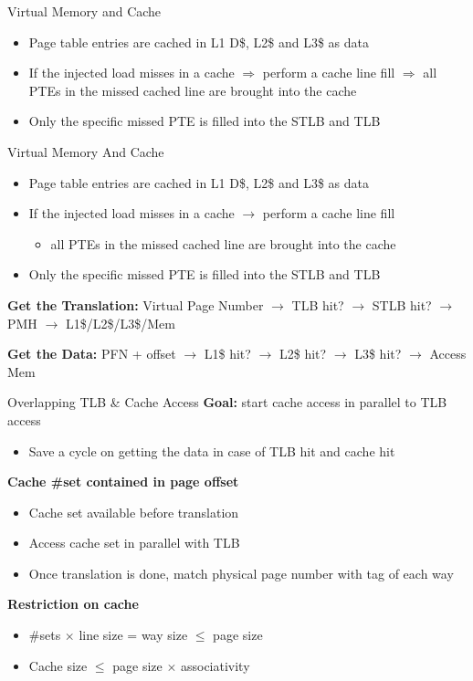 \documentclass[aspectratio=169,12pt]{beamer}
\begin{document}
\begin{frame}{Virtual Memory and Cache}
\begin{tikzpicture}
\end{tikzpicture}

\footnotesize
\begin{itemize}
\item Page table entries are cached in L1 D\$, L2\$ and L3\$ as data
\item If the injected load misses in a cache $\Rightarrow$ perform a cache line fill $\Rightarrow$ all PTEs in the missed cached line are brought into the cache
\item Only the specific missed PTE is filled into the STLB and TLB
\end{itemize}
\end{frame}


\begin{frame}{Virtual Memory And Cache}
\begin{itemize}
\item Page table entries are cached in L1 D\$, L2\$ and L3\$ as data
\item If the injected load misses in a cache $\rightarrow$ perform a cache line fill
    \begin{itemize}
    \item all PTEs in the missed cached line are brought into the cache
    \end{itemize}
\item Only the specific missed PTE is filled into the STLB and TLB
\end{itemize}
\textbf{Get the Translation:}
Virtual Page Number $\rightarrow$ TLB hit? $\rightarrow$ STLB hit? $\rightarrow$ PMH $\rightarrow$ L1\$/L2\$/L3\$/Mem

\textbf{Get the Data:}
PFN + offset $\rightarrow$ L1\$ hit? $\rightarrow$ L2\$ hit? $\rightarrow$ L3\$ hit? $\rightarrow$ Access Mem
\end{frame}

\begin{frame}{Overlapping TLB \& Cache Access}
\textbf{Goal:} start cache access in parallel to TLB access
\begin{itemize}
\item Save a cycle on getting the data in case of TLB hit and cache hit
\end{itemize}

\textbf{Cache \#set contained in page offset}
\begin{itemize}
\item Cache set available before translation
\item Access cache set in parallel with TLB
\item Once translation is done, match physical page number with tag of each way
\end{itemize}

\textbf{Restriction on cache}
\begin{itemize}
\item \#sets $\times$ line size = way size $\leq$ page size
\item Cache size $\leq$ page size $\times$ associativity
\end{itemize}
\end{frame}
\end{document}
